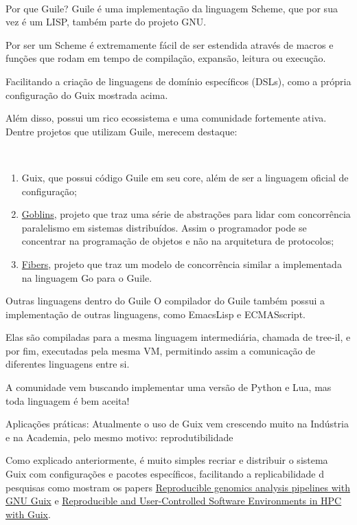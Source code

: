 \documentclass[bigger]{beamer}
\begin{document}
\begin{frame}[label={sec:orgbacea2a}]{⁤}
\begin{minipage}[c]{0.5\textwidth}
\end{minipage}
\end{frame}
\begin{frame}[label={sec:orgd17a87e}]{Por que Guile?}
Guile é uma implementação da linguagem Scheme, que por sua vez é um LISP, também parte do projeto GNU.

Por ser um Scheme é extremamente fácil de ser estendida através de macros e funções que rodam em tempo de
compilação, expansão, leitura ou execução.

Facilitando a criação de linguagens de domínio específicos (DSLs), como a própria configuração do Guix mostrada
acima.

Além disso, possui um rico ecossistema e uma comunidade fortemente ativa. Dentre projetos que utilizam Guile,
merecem destaque:
\end{frame}
\begin{frame}[label={sec:org67988ed}]{⁤}
\begin{enumerate}
\item Guix, que possui código Guile em seu core, além de ser a linguagem oficial de configuração;
\item \href{https://spritely.institute/goblins/}{Goblins}, projeto que traz uma série de abstrações para lidar com concorrência paralelismo em sistemas
distribuídos. Assim o programador pode se concentrar na programação de objetos e não na
arquitetura de protocolos;
\item \href{https://github.com/wingo/fibers}{Fibers}, projeto que traz um modelo de concorrência similar a implementada na linguagem Go para o Guile.
\end{enumerate}
\end{frame}
\begin{frame}[label={sec:org1c3efd5}]{Outras linguagens dentro do Guile}
O compilador do Guile também possui a implementação de outras linguagens, como EmacsLisp e ECMASscript.

Elas são compiladas para a mesma linguagem intermediária, chamada de tree-il, e por fim, executadas pela
mesma VM, permitindo assim a comunicação de diferentes linguagens entre si.

A comunidade vem buscando implementar uma versão de Python e Lua, mas toda linguagem é bem aceita!
\end{frame}
\begin{frame}[label={sec:orgdd647ad}]{Aplicações práticas:}
Atualmente o uso de Guix vem crescendo muito na Indústria e na Academia, pelo mesmo motivo: reprodutibilidade

Como explicado anteriormente, é muito simples recriar e distribuir o sistema Guix com configurações e pacotes
específicos, facilitando a replicabilidade d pesquisas como mostram os papers
\href{https://www.biorxiv.org/content/10.1101/298653v2}{Reproducible genomics analysis pipelines with GNU Guix} e
\href{https://inria.hal.science/hal-01161771/en}{Reproducible and User-Controlled Software Environments in HPC with Guix}.
\end{frame}
\end{document}
